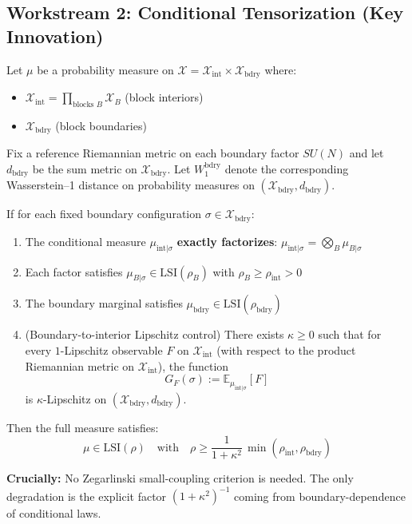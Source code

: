 \subsection{Workstream 2: Conditional Tensorization (Key Innovation)}

\begin{theorem}
\label{thm:conditional-tensorization-main}
Let $\mu$ be a probability measure on $\mathcal{X} = \mathcal{X}_{\mathrm{int}} \times \mathcal{X}_{\mathrm{bdry}}$
where:
\begin{itemize}
\item $\mathcal{X}_{\mathrm{int}} = \prod_{\text{blocks }B} \mathcal{X}_B$ (block interiors)
\item $\mathcal{X}_{\mathrm{bdry}}$ (block boundaries)
\end{itemize}

Fix a reference Riemannian metric on each boundary factor $SU(N)$ and let $d_{\mathrm{bdry}}$ be
the sum metric on $\mathcal{X}_{\mathrm{bdry}}$. Let $W_1^{\mathrm{bdry}}$ denote the corresponding
Wasserstein--1 distance on probability measures on $(\mathcal{X}_{\mathrm{bdry}},d_{\mathrm{bdry}})$.

If for each fixed boundary configuration $\sigma \in \mathcal{X}_{\mathrm{bdry}}$:
\begin{enumerate}
\item The conditional measure $\mu_{\mathrm{int}|\sigma}$ \textbf{exactly factorizes}:
$\mu_{\mathrm{int}|\sigma} = \bigotimes_B \mu_{B|\sigma}$
\item Each factor satisfies $\mu_{B|\sigma} \in \mathrm{LSI}(\rho_B)$ with $\rho_B \geq \rho_{\mathrm{int}} > 0$
\item The boundary marginal satisfies $\mu_{\mathrm{bdry}} \in \mathrm{LSI}(\rho_{\mathrm{bdry}})$
\item (Boundary-to-interior Lipschitz control) There exists $\kappa \geq 0$ such that for every
$1$-Lipschitz observable $F$ on $\mathcal{X}_{\mathrm{int}}$ (with respect to the product Riemannian
metric on $\mathcal{X}_{\mathrm{int}}$), the function
\[
G_F(\sigma) := \mathbb{E}_{\mu_{\mathrm{int}|\sigma}}[F]
\]
is $\kappa$-Lipschitz on $(\mathcal{X}_{\mathrm{bdry}},d_{\mathrm{bdry}})$.
\end{enumerate}

Then the full measure satisfies:
\[
\mu \in \mathrm{LSI}(\rho) \quad \text{with} \quad
\rho \geq \frac{1}{1+\kappa^2}\,\min(\rho_{\mathrm{int}}, \rho_{\mathrm{bdry}})
\]

\textbf{Crucially:} No Zegarlinski small-coupling criterion is needed. The only degradation is
the explicit factor $(1+\kappa^2)^{-1}$ coming from boundary-dependence of conditional laws.
\end{theorem}


